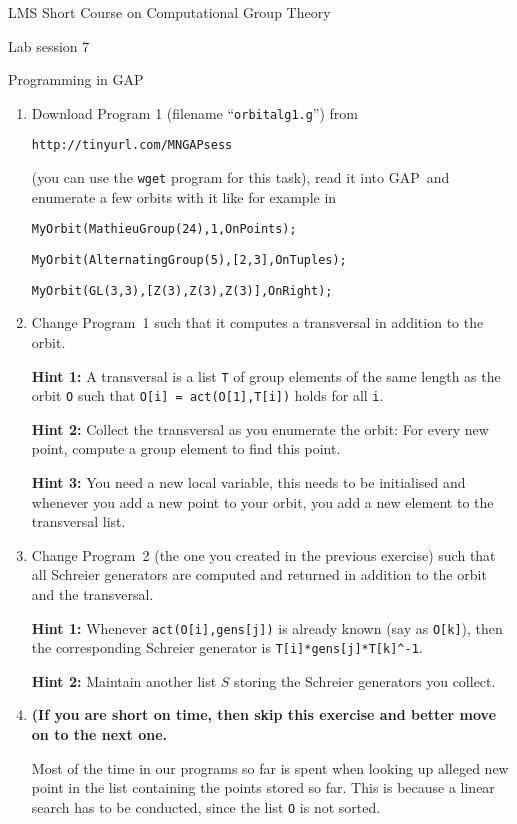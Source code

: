 \documentclass[12pt]{article}
\newcommand{\GAP}{\textsf{GAP}}
\newcommand{\hint}[1]{\par\textbf{Hint #1:}}
\begin{document}
\begin{center}
\large LMS Short Course on Computational Group Theory

\Large Lab session 7

\large Programming in \GAP
\end{center}

\begin{enumerate}
\setlength{\parskip}{0pt}
\item Download Program 1 (filename ``\texttt{orbitalg1.g}'') from

\hspace*{5mm}\texttt{http://tinyurl.com/MNGAPsess}

(you can use the \texttt{wget} program for this task),
read it into \GAP\ and enumerate a few orbits with it like for example in

\hspace*{5mm}\texttt{MyOrbit(MathieuGroup(24),1,OnPoints);}

\hspace*{5mm}\texttt{MyOrbit(AlternatingGroup(5),[2,3],OnTuples);}

\hspace*{5mm}\texttt{MyOrbit(GL(3,3),[Z(3),Z(3),Z(3)],OnRight);}
\item Change Program~1 such that it computes a transversal in addition
to the orbit.
\hint{1} A transversal is a list \texttt{T} of group elements of the same length
as the orbit \texttt{O} such that \texttt{O[i] = act(O[1],T[i])} holds for
all \texttt{i}.
\hint{2} Collect the transversal as you enumerate the orbit: For every new
point, compute a group element to find this point.
\hint{3} You need a new local variable, this needs to be initialised
and whenever you add a new point to your orbit, you add a new element
to the transversal list.
\item Change Program~2 (the one you created in the previous exercise) such
that all Schreier generators are computed and returned in addition to
the orbit and the transversal.
\hint{1} Whenever \texttt{act(O[i],gens[j])} is already known (say as
\texttt{O[k]}), then the corresponding Schreier generator is
\texttt{T[i]*gens[j]*T[k]\^{}-1}.
\hint{2} Maintain another list $S$ storing the Schreier generators you
collect.
\item \textbf{(If you are short on time, then skip this exercise and
better move on to the next one.}

Most of the time in our programs so far is spent when looking up alleged
new point in the list containing the points stored so far. This is because
a linear search has to be conducted, since the list \texttt{O} is not sorted.


\end{enumerate}
\end{document}

